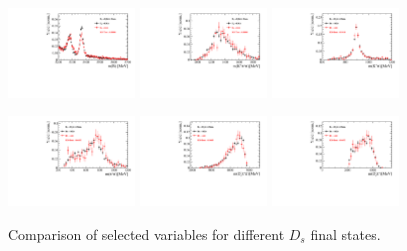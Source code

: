 \begin{figure}[h]

\includegraphics[height=!,width=0.3\textwidth]{figs/dataVsMC/finalState_signal/Ds2all_Bs_DTF_MM.pdf}
\includegraphics[height=!,width=0.3\textwidth]{figs/dataVsMC/finalState_signal/Ds2all_m_Kpipi.pdf}
\includegraphics[height=!,width=0.3\textwidth]{figs/dataVsMC/finalState_signal/Ds2all_m_Kpi.pdf}

\includegraphics[height=!,width=0.3\textwidth]{figs/dataVsMC/finalState_signal/Ds2all_m_pipi.pdf}
\includegraphics[height=!,width=0.3\textwidth]{figs/dataVsMC/finalState_signal/Ds2all_m_Dspipi.pdf}
\includegraphics[height=!,width=0.3\textwidth]{figs/dataVsMC/finalState_signal/Ds2all_m_Dspi.pdf}

\caption{Comparison of selected variables for different $D_s$ final states.}
\label{fig:}
\end{figure}


